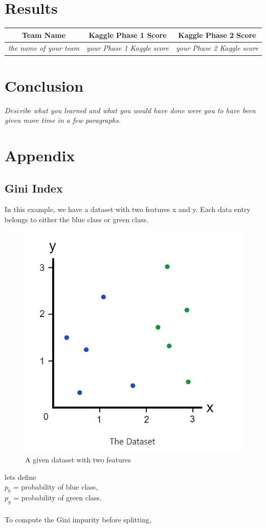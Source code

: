 \section{Results}

\begin{center}
 \begin{tabular}{|c | c | c |} 
 \hline
 Team Name & Kaggle Phase 1 Score & Kaggle Phase 2 Score  \\ [0.5ex]
 \hline\hline
 \emph{the name of your team} & \emph{your Phase 1 Kaggle score}  & \emph{your Phase 2 Kaggle score}  \\
 \hline
\end{tabular}
\end{center}

\section{Conclusion}
\emph{Describe what you learned and what you would have done were you to have been given more time in a few paragraphs.}
\newpage



\section*{Appendix}

\subsection*{Gini Index}

In this example, we have a dataset with two features x and y. Each data entry belongs to either the blue class or green class.

\begin{figure}[h]
	\centering
	\includegraphics[scale=0.2, width=0.3\columnwidth]{../figs/gini1.JPG}
	\caption{A given dataset with two features }
	\label{}
\end{figure}



lets define\\
$p_b$ = probability of blue class,\\
$p_g$ = probability of green class.\\ \\
To compute the Gini impurity before splitting,


